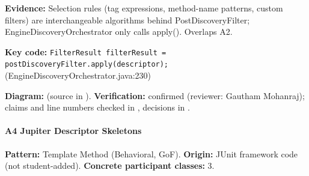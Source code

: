 \documentclass[11pt,a4paper]{article}
\begin{document}
\textbf{Evidence:} Selection rules (tag expressions, method-name patterns, custom filters) are interchangeable algorithms behind PostDiscoveryFilter; EngineDiscoveryOrchestrator only calls apply(). Overlaps A2.\par
\textbf{Key code:} \texttt{Filter\allowbreak{}Result filter\allowbreak{}Result = post\allowbreak{}Discovery\allowbreak{}Filter.\allowbreak{}apply(descriptor);} (EngineDiscoveryOrchestrator.java:230)\par
\textbf{Diagram:}  (source in ). \textbf{Verification:} confirmed (reviewer: Gautham Mohanraj); claims and line numbers checked in , decisions in .\par
\paragraph{A4 Jupiter Descriptor Skeletons} \textbf{Pattern:} Template Method (Behavioral, GoF). \textbf{Origin:} JUnit framework code (not student-added). \textbf{Concrete participant classes:} 3.\par
\end{document}
